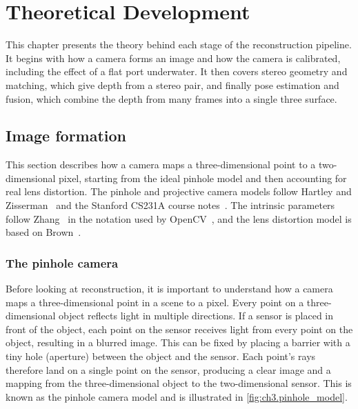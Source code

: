 \chapter{Theoretical Development}
\label{ch:theory}
This chapter presents the theory behind each stage of the reconstruction pipeline. It begins with how a camera forms an
image and how the camera is calibrated, including the effect of a flat port underwater. It then covers stereo geometry
and matching, which give depth from a stereo pair, and finally pose estimation and fusion, which combine the depth from
many frames into a single three surface.

\section{Image formation}
This section describes how a camera maps a three-dimensional point to a two-dimensional pixel, starting from the ideal pinhole model and
then accounting for real lens distortion. The pinhole and projective camera models follow Hartley and
Zisserman~\cite{hartleyMultipleViewGeometry2004} and the Stanford CS231A course notes~\cite{hataCS231ACourseNotesLink}.
The intrinsic parameters follow Zhang~\cite{zhangFlexibleNewTechnique2000} in the notation used by
OpenCV~\cite{opencvCameraCalibration3DLink}, and the lens distortion model is based on
Brown~\cite{brownDecenteringDistortionLenses1966,brownCloseRangeCameraCalibration1971}.

\subsection{The pinhole camera}
\label{subsec:ch3.pinhole}
Before looking at reconstruction, it is important to understand how a camera maps a three-dimensional point
in a scene to a pixel. Every point on a three-dimensional object reflects light in multiple directions. If a sensor is placed
in front of the object, each point on the sensor receives light from every point on the object, resulting in a blurred
image. This can be fixed by placing a barrier with a tiny hole (aperture) between the object and the sensor.
Each point's rays therefore land on a single point on the sensor, producing a clear image and a mapping from the three-dimensional object 
to the two-dimensional sensor. This is known as the pinhole camera
model \cite{hataCS231ACourseNotesLink} and is illustrated in \autoref{fig:ch3.pinhole_model}.

